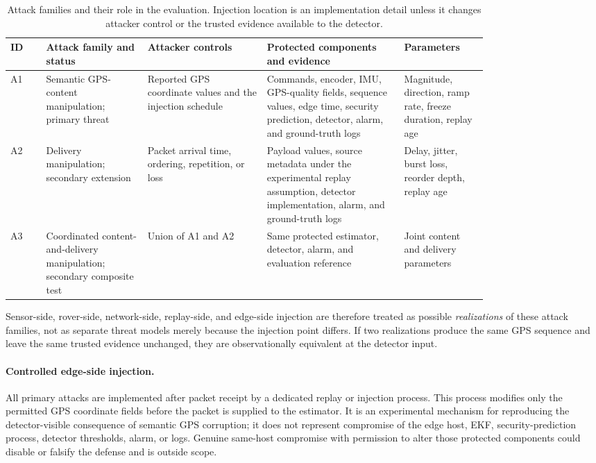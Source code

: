 \documentclass[11pt,a4paper]{article}
\begin{document}
\begin{table}[t]
\centering
\caption{Attack families and their role in the evaluation. Injection location is
an implementation detail unless it changes attacker control or the trusted
evidence available to the detector.}
\label{tab:attack-families}
\scriptsize
\begin{tabular}{L{0.06\linewidth} L{0.17\linewidth} L{0.20\linewidth} L{0.23\linewidth} L{0.14\linewidth}}
\toprule
\textbf{ID} & \textbf{Attack family and status} & \textbf{Attacker controls} &
\textbf{Protected components and evidence} & \textbf{Parameters} \\
\midrule
A1 & Semantic GPS-content manipulation; primary threat &
Reported GPS coordinate values and the injection schedule &
Commands, encoder, IMU, GPS-quality fields, sequence values, edge time,
security prediction, detector, alarm, and ground-truth logs &
Magnitude, direction, ramp rate, freeze duration, replay age \\
A2 & Delivery manipulation; secondary extension &
Packet arrival time, ordering, repetition, or loss &
Payload values, source metadata under the experimental replay assumption,
detector implementation, alarm, and ground-truth logs &
Delay, jitter, burst loss, reorder depth, replay age \\
A3 & Coordinated content-and-delivery manipulation; secondary composite test &
Union of A1 and A2 &
Same protected estimator, detector, alarm, and evaluation reference &
Joint content and delivery parameters \\
\bottomrule
\end{tabular}
\end{table}

Sensor-side, rover-side, network-side, replay-side, and edge-side injection are
therefore treated as possible \emph{realizations} of these attack families, not
as separate threat models merely because the injection point differs. If two
realizations produce the same GPS sequence and leave the same trusted evidence
unchanged, they are observationally equivalent at the detector input.

\paragraph{Controlled edge-side injection.}
All primary attacks are implemented after packet receipt by a dedicated replay
or injection process. This process modifies only the permitted GPS coordinate
fields before the packet is supplied to the estimator. It is an experimental
mechanism for reproducing the detector-visible consequence of semantic GPS
corruption; it does not represent compromise of the edge host, EKF,
security-prediction process, detector thresholds, alarm, or logs. Genuine
same-host compromise with permission to alter those protected components could
disable or falsify the defense and is outside scope.
\end{document}
